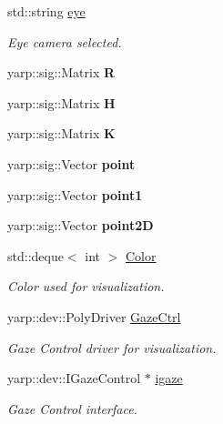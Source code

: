 \begin{DoxyCompactItemize}
\mbox{\label{classSuperqModule_a016da49606647c049c4b857a32c633c6}} 
std\+::string \mbox{\hyperlink{classSuperqModule_a016da49606647c049c4b857a32c633c6}{eye}}
\begin{DoxyCompactList}\small\item\em Eye camera selected. \end{DoxyCompactList}\item 
\mbox{\label{classSuperqModule_ab0570fcea5cbee6364f780cca614164d}} 
yarp\+::sig\+::\+Matrix {\bfseries R}
\item 
\mbox{\label{classSuperqModule_acf23ebc65162db020fd4e25ca73ea165}} 
yarp\+::sig\+::\+Matrix {\bfseries H}
\item 
\mbox{\label{classSuperqModule_ac6ee7467d82e835c0d1b2e35236e4aaf}} 
yarp\+::sig\+::\+Matrix {\bfseries K}
\item 
\mbox{\label{classSuperqModule_a80128e303c0d59016e41493ca50cc94e}} 
yarp\+::sig\+::\+Vector {\bfseries point}
\item 
\mbox{\label{classSuperqModule_ab8daf379295df5a47ced6f06acfe0df9}} 
yarp\+::sig\+::\+Vector {\bfseries point1}
\item 
\mbox{\label{classSuperqModule_a8839fda8369d4e2e73714cc1db6e0f5e}} 
yarp\+::sig\+::\+Vector {\bfseries point2D}
\item 
\mbox{\label{classSuperqModule_a15f7523202cf192d71f188db2647e50c}} 
std\+::deque$<$ int $>$ \mbox{\hyperlink{classSuperqModule_a15f7523202cf192d71f188db2647e50c}{Color}}
\begin{DoxyCompactList}\small\item\em Color used for visualization. \end{DoxyCompactList}\item 
\mbox{\label{classSuperqModule_a1ce22879df6c4586ed72a3e3b67609bb}} 
yarp\+::dev\+::\+Poly\+Driver \mbox{\hyperlink{classSuperqModule_a1ce22879df6c4586ed72a3e3b67609bb}{Gaze\+Ctrl}}
\begin{DoxyCompactList}\small\item\em Gaze Control driver for visualization. \end{DoxyCompactList}\item 
\mbox{\label{classSuperqModule_a00ea631bed0909310e2e505f0aca688f}} 
yarp\+::dev\+::\+I\+Gaze\+Control $\ast$ \mbox{\hyperlink{classSuperqModule_a00ea631bed0909310e2e505f0aca688f}{igaze}}
\begin{DoxyCompactList}\small\item\em Gaze Control interface. \end{DoxyCompactList}\item 

\end{DoxyCompactItemize}
